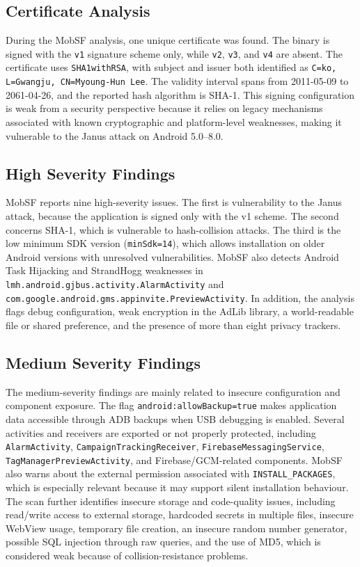 \subsection{Certificate Analysis}
During the MobSF analysis, one unique certificate was found. The binary is signed with the \texttt{v1} signature scheme only, while \texttt{v2}, \texttt{v3}, and \texttt{v4} are absent. The certificate uses \texttt{SHA1withRSA}, with subject and issuer both identified as \texttt{C=ko, L=Gwangju, CN=Myoung-Hun Lee}. The validity interval spans from 2011-05-09 to 2061-04-26, and the reported hash algorithm is SHA-1. This signing configuration is weak from a security perspective because it relies on legacy mechanisms associated with known cryptographic and platform-level weaknesses, making it vulnerable to the Janus attack on Android 5.0--8.0.

\subsection{High Severity Findings}
MobSF reports nine high-severity issues. The first is vulnerability to the Janus attack, because the application is signed only with the v1 scheme. The second concerns SHA-1, which is vulnerable to hash-collision attacks. The third is the low minimum SDK version (\texttt{minSdk=14}), which allows installation on older Android versions with unresolved vulnerabilities.
MobSF also detects Android Task Hijacking and StrandHogg weaknesses in \texttt{lmh.android.gjbus.activity.AlarmActivity} and \texttt{com.google.android.gms.appinvite.PreviewActivity}. In addition, the analysis flags debug configuration, weak encryption in the AdLib library, a world-readable file or shared preference, and the presence of more than eight privacy trackers.

\subsection{Medium Severity Findings}
The medium-severity findings are mainly related to insecure configuration and component exposure. The flag \texttt{android:allowBackup=true} makes application data accessible through ADB backups when USB debugging is enabled.
Several activities and receivers are exported or not properly protected, including \texttt{AlarmActivity}, \texttt{CampaignTrackingReceiver}, \texttt{FirebaseMessagingService}, \texttt{TagManagerPreviewActivity}, and Firebase/GCM-related components. MobSF also warns about the external permission associated with \texttt{INSTALL\_PACKAGES}, which is especially relevant because it may support silent installation behaviour.
The scan further identifies insecure storage and code-quality issues, including read/write access to external storage, hardcoded secrets in multiple files, insecure WebView usage, temporary file creation, an insecure random number generator, possible SQL injection through raw queries, and the use of MD5, which is considered weak because of collision-resistance problems.

